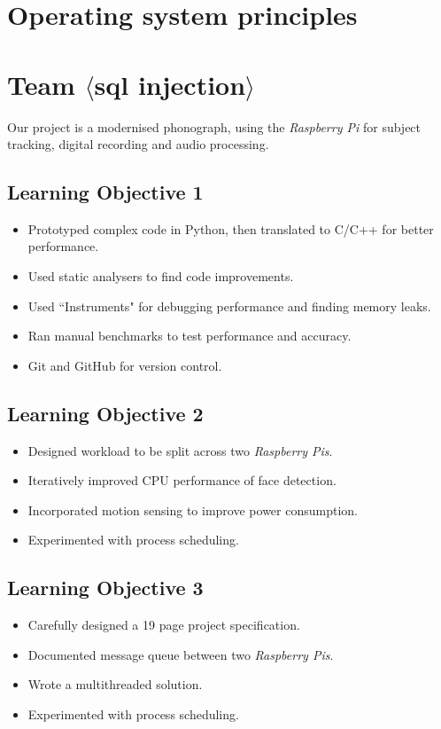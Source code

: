 \documentclass[11pt,a4paper]{article}
\newcommand{\rpi}{\textit{Raspberry Pi\textsuperscript{\textregistered}}}
\newcommand{\rpis}{\textit{Raspberry Pi\textsuperscript{\textregistered}s}}
\begin{document}
\section*{Operating system principles}

\section*{Team $\langle$sql injection$\rangle$}

Our project is a modernised phonograph, using the \rpi\xspace for subject tracking, digital recording and audio processing.

\subsection*{Learning Objective 1}


\begin{itemize}
  \item Prototyped complex code in Python, then translated to C/C++ for better performance.
  \item Used static analysers to find code improvements.
  \item Used ``Instruments" for debugging performance and finding memory leaks.
  \item Ran manual benchmarks to test performance and accuracy.
  \item Git and GitHub for version control.
\end{itemize}

\subsection*{Learning Objective 2}

\begin{itemize}
  \item Designed workload to be split across two \rpis.
  \item Iteratively improved CPU performance of face detection.
  \item Incorporated motion sensing to improve power consumption.
  \item Experimented with process scheduling.
\end{itemize}

\subsection*{Learning Objective 3}

\begin{itemize}
  \item Carefully designed a 19 page project specification.
  \item Documented message queue between two \rpis.
  \item Wrote a multithreaded solution.
  \item Experimented with process scheduling.
\end{itemize}
\end{document}
